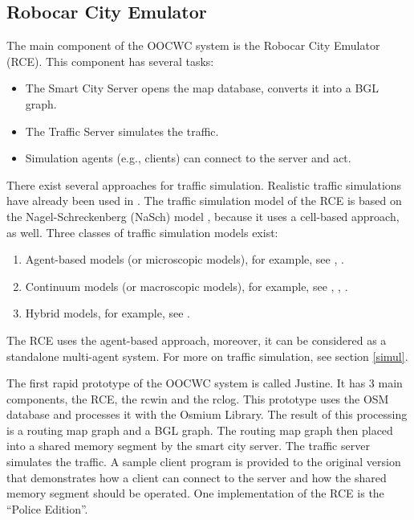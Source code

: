 \documentclass[b5paper,12pt]{report}
\theoremstyle{definition}
\begin{document}
\subsection{Robocar City Emulator}
\label{rcemu}

The main component of the OOCWC system is the Robocar City Emulator (RCE). This component has several tasks:
\begin{itemize}
\item The Smart City Server opens the map database, converts it into a BGL graph.
\item The Traffic Server simulates the traffic.
\item Simulation agents (e.g., clients) can connect to the server and act.
\end{itemize}

There exist several approaches for traffic simulation. Realistic traffic simulations have already been used in \cite{realsim}. The traffic simulation model of the RCE is based on the Nagel-Schreckenberg (NaSch) model \cite{nasch}, because it uses a cell-based approach, as well. Three classes of traffic simulation models exist: 

\begin{enumerate}
  \item Agent-based models (or microscopic models), for example, see \cite{treiber2000congested}, \cite{duncan1997high}.
  \item Continuum models (or macroscopic models), for example, see \cite{fan2013comparative}, \cite{sewall2010continuum}, \cite{chrobok2001traffic}.
  \item Hybrid models, for example, see \cite{sewall2011interactive}.
\end{enumerate}

The RCE uses the agent-based approach, moreover, it can be considered as a standalone multi-agent system. For more on traffic simulation, see section \ref{simul}.

The first rapid prototype of the OOCWC system is called Justine. It has 3 main components, the RCE, the rcwin and the rclog. This prototype uses the OSM database and processes it with the Osmium Library. The result of this processing is a routing map graph and a BGL graph. The routing map graph then placed into a shared memory segment by the smart city server. The traffic server simulates the traffic. A sample client program is provided to the original version that demonstrates how a client can connect to the server and how the shared memory segment should be operated. One implementation of the RCE is the \enquote{Police Edition}.
\end{document}

